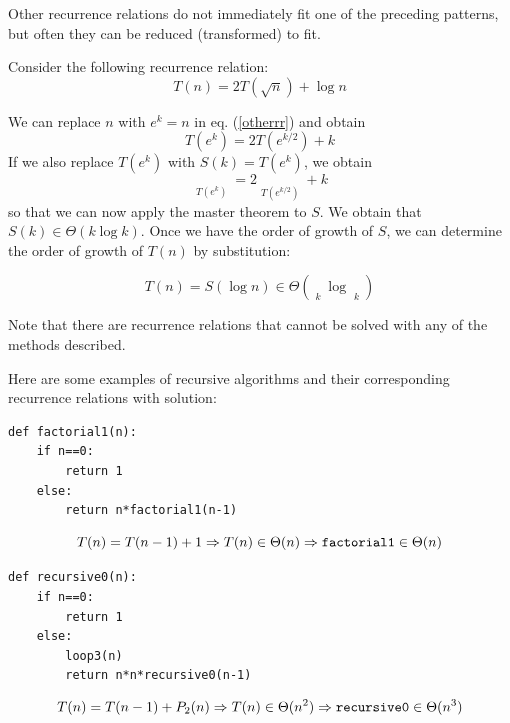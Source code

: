 \documentclass[justified,sixbynine]{tufte-book}
\def\stackunder#1#2{\mathrel{\mathop{#2}\limits_{#1}}}
\theoremstyle{plain}%
\theoremstyle{definition}
\theoremstyle{remark}
\begin{document}
\begin{fullwidth}
Other recurrence relations do not immediately fit one of the preceding patterns, but often they can be reduced (transformed) to fit.

Consider the following recurrence relation:
\begin{equation}
T(n)=
2T(\sqrt{n})+\log n
\label{otherrr}
\end{equation}

We can replace $n$ with $e^k=n$ in eq. (\ref{otherrr}) and obtain
\begin{equation}
T(e^k)=
2T(e^{k/2})+k
\end{equation}
If we also replace $T(e^k)$ with $S(k)=T(e^k)$, we obtain
\begin{equation}
\stackunder{T(e^k)}{\underbrace{S(k)}}=
2\stackunder{T(e^{k/2})}{\underbrace{S(k/2)}}+k
\end{equation}
so that we can now apply the master theorem to $S$. We obtain that $S(k)\in
\Theta (k\log k)$. Once we have the order of growth of $S$, we can determine
the order of growth of $T(n)$ by substitution:

\begin{equation}
T(n)=S(\log n)\in \Theta (\stackunder{k}{\underbrace{\log n}}\log
\stackunder{k}{\underbrace{\log n}})
\end{equation}

Note that there are recurrence relations that cannot be solved with any of
the methods described.

Here are some examples of recursive algorithms and their corresponding recurrence relations with solution:

\begin{lstlisting}
def factorial1(n):
    if n==0:
        return 1
    else:
        return n*factorial1(n-1)
\end{lstlisting}

\begin{equation}
T(n)=T(n-1)+1\Rightarrow T(n)\in \Theta (n)\Rightarrow \text{{\tt factorial1}%
}\in \Theta (n)
\end{equation}

\begin{lstlisting}
def recursive0(n):
    if n==0:
        return 1
    else:
        loop3(n)
        return n*n*recursive0(n-1)
\end{lstlisting}

\begin{equation}
T(n)=T(n-1)+P_2(n)\Rightarrow T(n)\in \Theta (n^2)\Rightarrow \text{{\tt %
recursive0}}\in \Theta (n^3)
\end{equation}


\end{fullwidth}
\end{document}
